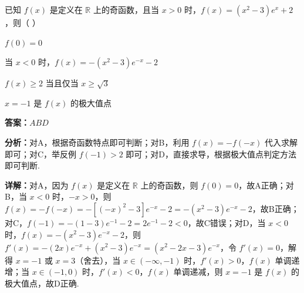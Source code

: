 \begin{question}[points=6]
已知 $f(x)$ 是定义在 $\mathbb{R}$ 上的奇函数，且当 $x>0$ 时，$f(x)=(x^2-3)e^x+2$，则（ ）
\begin{choices}
  \item $f(0)=0$
  \item 当 $x<0$ 时，$f(x)=-(x^2-3)e^{-x}-2$
  \item $f(x)\ge 2$ 当且仅当 $x\ge\sqrt{3}$
  \item $x=-1$ 是 $f(x)$ 的极大值点
\end{choices}
\begin{solution}
\textbf{答案：}$ABD$

\textbf{分析：}对A，根据奇函数特点即可判断；对B，利用 $f(x)=-f(-x)$ 代入求解即可；对C，举反例 $f(-1)>2$ 即可；对D，直接求导，根据极大值点判定方法即可判断.

\textbf{详解：}对A，因为 $f(x)$ 是定义在 $\mathbb{R}$ 上的奇函数，则 $f(0)=0$，故A正确；对B，当 $x<0$ 时，$-x>0$，则 $f(x)=-f(-x)=-[(-x)^2-3]e^{-x}-2=-(x^2-3)e^{-x}-2$，故B正确；对C，$f(-1)=-(1-3)e^{-1}-2=2e^{-1}-2<0$，故C错误；对D，当 $x<0$ 时，$f(x)=-(x^2-3)e^{-x}-2$，则 $f'(x)=-(2x)e^{-x}+(x^2-3)e^{-x}=(x^2-2x-3)e^{-x}$，令 $f'(x)=0$，解得 $x=-1$ 或 $x=3$（舍去），当 $x\in(-\infty,-1)$ 时，$f'(x)>0$，$f(x)$ 单调递增；当 $x\in(-1,0)$ 时，$f'(x)<0$，$f(x)$ 单调递减，则 $x=-1$ 是 $f(x)$ 的极大值点，故D正确.
\end{solution}
\end{question}

